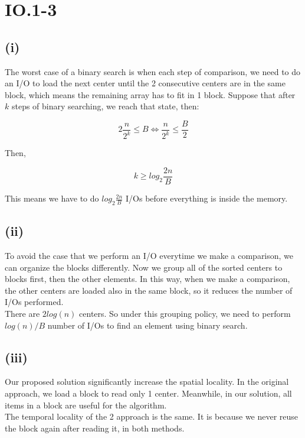 \section*{IO.1-3}
\subsection*{(i)}
The worst case of a binary search is when each step of comparison, we need to do an I/O to load the next center until the 2 consecutive centers are in the same block, which means the remaining array has to fit in 1 block. Suppose that after $k$ steps of binary searching, we reach that state, then:

$$2 \frac{n}{2^k} \leq B \iff \frac{n}{2^k} \leq \frac{B}{2}$$

Then,

$$k \geq log_2 \frac{2n}{B} $$

This means we have to do $log_2 \frac{2n}{B}$ I/Os before everything is inside the memory.

\subsection*{(ii)}
To avoid the case that we perform an I/O everytime we make a comparison, we can organize the blocks differently. Now we group all of the sorted centers to blocks first, then the other elements. In this way, when we make a comparison, the other centers are loaded also in the same block, so it reduces the number of I/Os performed.\\

There are $2log(n)$ centers. So under this grouping policy, we need to perform $log(n) / B$ number of I/Os to find an element using binary search.

\subsection*{(iii)}
Our proposed solution significantly increase the spatial locality. In the original approach, we load a block to read only 1 center. Meanwhile, in our solution, all items in a block are useful for the algorithm.\\

The temporal locality of the 2 approach is the same. It is because we never reuse the block again after reading it, in both methods.
